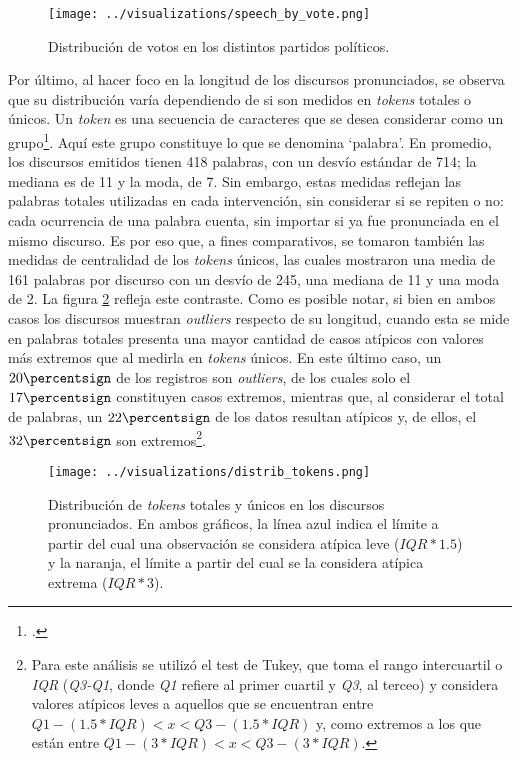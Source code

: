 \begin{figure}[h!]
    \centering
    \texttt{[image: ../visualizations/speech\_by\_vote.png]}
    \caption{Distribuci\'on de votos en los distintos partidos pol\'iticos.}%
    \label{fig-distrib-speech}
\end{figure}

Por \'ultimo, al hacer foco en la longitud de los discursos pronunciados, se observa que su
distribuci\'on var\'ia dependiendo de si son medidos en \textit{tokens} totales o \'unicos.
Un \textit{token} es una secuencia de caracteres que se desea considerar como un
grupo\footnote{\citet*{bird2009natural}.}. Aqu\'i este grupo constituye lo que se denomina
`palabra'. En promedio, los discursos emitidos tienen 418 palabras, con un desv\'io
est\'andar de 714; la mediana es de 11 y la moda, de 7. Sin embargo, estas medidas
reflejan las palabras totales utilizadas en cada intervenci\'on, sin considerar si se repiten
o no: cada ocurrencia de una palabra cuenta, sin importar si ya fue pronunciada en el mismo
discurso. Es por eso que, a fines comparativos, se tomaron tambi\'en las medidas de centralidad
de los \textit{tokens} \'unicos, las cuales mostraron una media de 161 palabras por discurso
con un desv\'io de 245, una mediana de 11 y una moda de 2. La figura \ref{fig-distrib-tokens}
refleja este contraste. Como es posible notar, si bien en ambos casos los discursos
muestran \textit{outliers} respecto de su longitud, cuando esta se mide en palabras
totales presenta una mayor cantidad de casos at\'ipicos con valores m\'as extremos que
al medirla en \textit{tokens} \'unicos. En este \'ultimo caso, un
$20\percentsign$ de los registros son \textit{outliers}, de los cuales solo el
$17\percentsign$ constituyen casos extremos, mientras que, al considerar
el total de palabras, un $22\percentsign$ de los datos resultan at\'ipicos y,
de ellos, el $32\percentsign$ son extremos\footnote{Para este an\'alisis se utiliz\'o el
test de Tukey, que toma el rango intercuartil o \textit{IQR} (\textit{Q3-Q1}, donde
\textit{Q1} refiere al primer cuartil y \textit{Q3}, al terceo) y considera
valores at\'ipicos leves a aquellos que se encuentran entre
$Q1 - (1.5 * IQR) < x < Q3 - (1.5 * IQR)$ y, como extremos a los que est\'an entre
$Q1 - (3 * IQR) < x < Q3 - (3 * IQR)$.}.

\begin{figure}[h!]%
    \centering%
    \texttt{[image: ../visualizations/distrib\_tokens.png]}%
    \caption{Distribuci\'on de \textit{tokens} totales y \'unicos en los discursos pronunciados. En ambos gr\'aficos,
    la l\'inea azul indica el l\'imite a partir del cual una observaci\'on se considera at\'ipica leve
    ($IQR*1.5$) y la naranja, el l\'imite a partir del cual se la considera at\'ipica extrema ($IQR*3$).}%
    \label{fig-distrib-tokens}%
\end{figure}%


